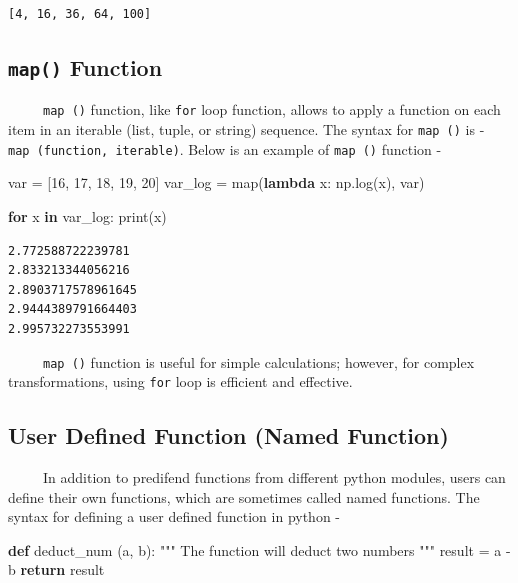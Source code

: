 \documentclass[
  letterpaper,
  DIV=11,
  numbers=noendperiod]{scrreprt}
\newenvironment{Shaded}{\begin{snugshade}}{\end{snugshade}}
\newcommand{\BuiltInTok}[1]{\textcolor[rgb]{0.00,0.23,0.31}{#1}}
\newcommand{\CommentTok}[1]{\textcolor[rgb]{0.37,0.37,0.37}{#1}}
\newcommand{\ControlFlowTok}[1]{\textcolor[rgb]{0.00,0.23,0.31}{\textbf{#1}}}
\newcommand{\DecValTok}[1]{\textcolor[rgb]{0.68,0.00,0.00}{#1}}
\newcommand{\KeywordTok}[1]{\textcolor[rgb]{0.00,0.23,0.31}{\textbf{#1}}}
\newcommand{\NormalTok}[1]{\textcolor[rgb]{0.00,0.23,0.31}{#1}}
\newcommand{\OperatorTok}[1]{\textcolor[rgb]{0.37,0.37,0.37}{#1}}
\begin{document}
\begin{verbatim}
[4, 16, 36, 64, 100]
\end{verbatim}

\subsection{\texorpdfstring{\texttt{map()}
Function}{map() Function}}\label{map-function}

~~~~~\texttt{map\ ()} function, like \texttt{for} loop function, allows
to apply a function on each item in an iterable (list, tuple, or string)
sequence. The syntax for \texttt{map\ ()} is -
\texttt{map\ (function,\ iterable)}. Below is an example of
\texttt{map\ ()} function -

\begin{Shaded}
\begin{Highlighting}[]
\NormalTok{var }\OperatorTok{=}\NormalTok{ [}\DecValTok{16}\NormalTok{, }\DecValTok{17}\NormalTok{, }\DecValTok{18}\NormalTok{, }\DecValTok{19}\NormalTok{, }\DecValTok{20}\NormalTok{]}
\NormalTok{var\_log }\OperatorTok{=} \BuiltInTok{map}\NormalTok{(}\KeywordTok{lambda}\NormalTok{ x: np.log(x), var)}

\ControlFlowTok{for}\NormalTok{ x }\KeywordTok{in}\NormalTok{ var\_log:}
  \BuiltInTok{print}\NormalTok{(x)}
\end{Highlighting}
\end{Shaded}

\begin{verbatim}
2.772588722239781
2.833213344056216
2.8903717578961645
2.9444389791664403
2.995732273553991
\end{verbatim}

~~~~~\texttt{map\ ()} function is useful for simple calculations;
however, for complex transformations, using \texttt{for} loop is
efficient and effective.

\subsection{User Defined Function (Named
Function)}\label{user-defined-function-named-function}

~~~~~In addition to predifend functions from different python modules,
users can define their own functions, which are sometimes called named
functions. The syntax for defining a user defined function in python -

\begin{Shaded}
\begin{Highlighting}[]
\KeywordTok{def}\NormalTok{ deduct\_num (a, b):}
  \CommentTok{"""}
\CommentTok{  The function will deduct two numbers}
\CommentTok{  """}
\NormalTok{  result }\OperatorTok{=}\NormalTok{ a }\OperatorTok{{-}}\NormalTok{ b}
  \ControlFlowTok{return}\NormalTok{ result}
\end{Highlighting}
\end{Shaded}
\end{document}
